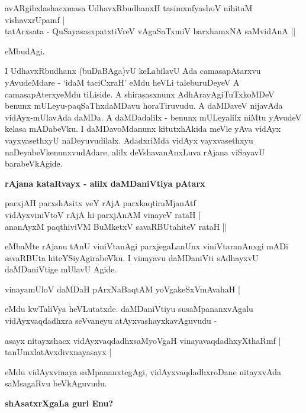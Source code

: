 \begin{shloka}
avARgibxlashacxmasa UdhavxRbudhanxH tasimxnfyashoV nihitaM vishavxrUpamf |\\\label{92}
tatArxsata - QuSayasasxpatxtiVreV vAgaSaTxmiV barxhamxNA saMvidAnA ||
\end{shloka}

\noindent
eMbudAgi.

I UdhavxRbudhanx (buDaBAga)vU keLabilavU Ada camasapAtarxvu yAvu\-deMdare - `idaM taciCxraH'\- eMdu heVLi taleburuDeyeV A camasapAterxyeMdu tiLiside. A shirasasxnunx AdhAravAgiTuTxkoMDeV benunx\- mULeyu-paqSaThxdaMDavu hora\-Tiruvudu. A daMDaveV nijavAda vidAyx-mUlavAda daMDa. A daMDadalilx - benunx mULeyalilx niMtu yAvudeV kelasa mADabeVku. I daMDavoMdanunx kitutxhAkida meVle yAva vidAyx vayxvasethxyU naDeyuvudilalx. AdadxriMda vidAyx vayxvasethxyu naDeyabeVkenunxvudAdare, alilx deVshavanAnxLuva rAjana viSayavU barabeVkAgide.

{\bigskip
\noindent
{\large\bf rAjana kataRvayx - alilx daMDaniVtiya pAtarx}}\label{page92}
\medskip

\begin{shloka}
parxjAH parxshAsitx veY rAjA parxkaqtiraMjanAtf\\\label{92}
vidAyxviniVtoV rAjA hi parxjAnAM vinayeV rataH |\\
ananAyxM paqthiviVM BuMketxV savaRBUtahiteV rataH ||
\end{shloka}

\noindent
eMbaMte rAjanu tAnU viniVtanAgi parxjegaLanUnx viniVtaranAnxgi mADi savaRBUta hiteYSiyAgira\-beVku. I vinayavu daMDaniVti sAdhayxvU daMDaniVtige mUlavU Agide.

\begin{shloka}
vinayamUloV daMDaH pArxNaBaqtAM yoVgakeSxVmAvahaH |\label{93}
\end{shloka}

\noindent
eMdu kwTaliVya heVLutatxde. daMDaniVtiyu susaMpananxvAgalu vidAyxvaqdadhxra seVvaneyu atAyx\-vashayxka\-vAguvudu -

\begin{shloka}
asayx nitayxshacx vidAyxvaqdadhxsaMyoVgaH vinayavaqdadhxyXthaRmf |\\\label{93}
tanUmxlatAvxdivxnayasayx |
\end{shloka}

\noindent
eMdu vidAyxvinaya saMpananxtegAgi, vidAyxvaqdadhxroDane nitayxvAda saMsagaRvu beVkAguvudu.

{\bigskip
\noindent
{\large\bf shAsatxrXgaLa guri Enu?}}\label{page93}
\medskip

